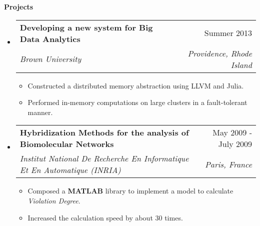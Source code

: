 \documentclass[letterpaper,11pt]{article}
\makeatletter
\newcommand{\resitem}[1]{\item[\ding{226}] #1 \vspace{-2pt}}
\newcommand{\resheading}[1]{{\large \colorbox{mygrey}{\begin{minipage}{\textwidth}{\textbf{#1 \vphantom{p\^{E}}}}\end{minipage}}}}
\newcommand{\ressubheading}[4]{
\begin{tabular*}{7.0in}{l@{\extracolsep{\fill}}r}
		\textbf{#1} & #2 \\
		\textit{#3} & \textit{#4} \\
\end{tabular*}\vspace{-6pt}}
\newcommand{\reslineheading}[2]{
\begin{tabular*}{7.0in}{l@{\extracolsep{\fill}}r}
		\textbf{#1} & #2 \\
\end{tabular*}\vspace{-6pt}}
\makeatother
\begin{document}
\resheading{Projects}
\begin{itemize}

\item
	\ressubheading{Developing a new system for Big Data Analytics}{Summer 2013}{Brown University}{Providence, Rhode Island}
	\begin{itemize}
		\resitem{Constructed a distributed memory abstraction using LLVM and Julia.} 
		\resitem{Performed in-memory computations on large clusters in a fault-tolerant manner.}
	\end{itemize}

\item
	\ressubheading{Hybridization Methods for the analysis of Biomolecular Networks}{May 2009 - July 2009}{Institut National De Recherche En Informatique Et En Automatique (INRIA)}{Paris, France}
	\begin{itemize}
        \resitem{Composed a \textbf{MATLAB} library to implement a model to calculate \textit{Violation Degree}.} 
        \resitem{Increased the calculation speed by about 30 times.}
	\end{itemize}
%

\end{itemize}
\end{document}
